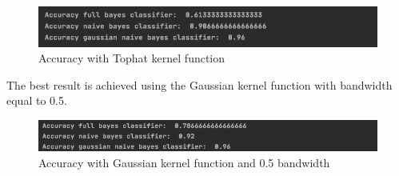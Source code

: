 \documentclass[12pt]{report}
\begin{document}
\begin{figure}[h!]
    \centering
    \includegraphics[width=14cm]{Pictures/tophat kernel accuracy.png}
    \caption{Accuracy with Tophat kernel function}
\end{figure}

The best result is achieved using the Gaussian kernel function with bandwidth equal to 0.5.

\begin{figure}[h!]
    \centering
    \includegraphics[width=14cm]{Pictures/best accuracy.png}
    \caption{Accuracy with Gaussian kernel function and 0.5 bandwidth}
\end{figure}
\end{document}
